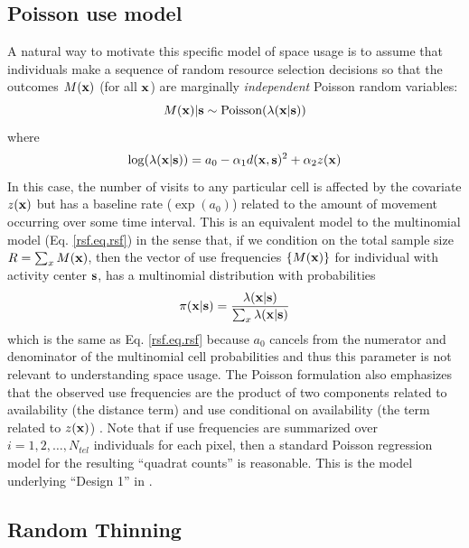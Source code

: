 \documentclass[12pt]{article}
\begin{document}
\subsection{Poisson use model}

A natural way to motivate this specific model of space usage is to
assume that individuals make a sequence of random resource selection
decisions so that the outcomes $M({\bf x})$ (for all ${\bf
  x}$) are marginally {\it
  independent} Poisson random variables:
\[
 M({\bf x})|{\bf s} \sim \mbox{Poisson}( \lambda({\bf x}|{\bf s}))
\]
where
\[
\log(\lambda({\bf x}|{\bf s})) = a_{0} -\alpha_{1} d({\bf x},{\bf
  s})^{2} + \alpha_{2} z({\bf x})
\]
In this case, the number of visits to any particular cell is affected
by the covariate $z({\bf x})$ but has a baseline rate ($\exp(a_{0})$)
related to the amount of movement occurring over some time interval.
This is an equivalent model to the multinomial model
(Eq. \ref{rsf.eq.rsf}) in the sense that, if we condition on the total
sample size $R = \sum_{x} M({\bf x})$, then the vector of use
frequencies $\{ M({\bf x}) \}$ for individual with activity center
${\bf s}$, has a multinomial distribution with probabilities
\[
 \pi({\bf x}|{\bf s}) = \frac{\lambda({\bf x}|{\bf s})}{\sum_{x}
   \lambda({\bf x}|{\bf s})}
\]
which is the same as Eq. \ref{rsf.eq.rsf} because $a_{0}$ cancels from
the numerator and denominator of the multinomial cell probabilities
and thus this parameter is not relevant to understanding space usage.
The Poisson formulation also emphasizes that the
observed use frequencies are the product of two components related to
availability (the distance term) and use conditional on availability
(the term related to $z({\bf x})$) \citep{forester_etal:2009}.
Note that if use frequencies are summarized over
$i=1,2,\ldots,N_{tel}$ individuals for each pixel, then a standard
Poisson regression model for the resulting ``quadrat counts'' is
reasonable. This is the model underlying ``Design 1'' in
\citet{manly_etal:2002}.

\subsection{Random Thinning}
\end{document}
